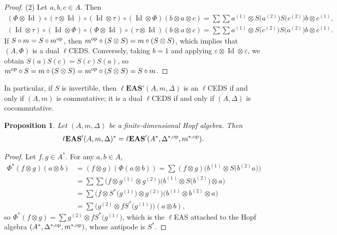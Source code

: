 \documentclass[pdftex]{sigma}
\numberwithin{equation}{section}
\newtheorem{Proposition}[Theorem]{Proposition}
 { \theoremstyle{definition}
\newtheorem{Definition}[Theorem]{Definition}
\newtheorem{Note}[Theorem]{Note}
\newtheorem{Example}[Theorem]{Example}
\newtheorem{Remark}[Theorem]{Remark}
\newtheorem{Notation}[Theorem]{Notation}}
\newcommand{\leas}{\ell\mathbf{EAS}}
\begin{document}
\begin{proof}
(2) Let $a,b,c\in A$. Then
\begin{gather*}
(\Phi\otimes \operatorname{Id})\circ (\tau \otimes \operatorname{Id})\circ (\operatorname{Id} \otimes \tau)\circ (\operatorname{Id} \otimes \Phi)(b\otimes a\otimes c)=\sum \sum a^{(1)}\otimes S\bigl(a^{(2)}\bigr)S\bigl(c^{(2)}\bigr)b\otimes c^{(1)},\\
\nonumber(\operatorname{Id} \otimes \tau)\circ (\operatorname{Id} \otimes \Phi)\circ (\Phi\otimes \operatorname{Id})\circ (\tau \otimes \operatorname{Id})(b\otimes a\otimes c)=\sum \sum a^{(1)}\otimes S\bigl(c^{(2)}\bigr)S\bigl(a^{(2)}\bigr)b\otimes c^{(1)}.
\end{gather*}
If $S\circ m=S\circ m^{\rm op}$, then $m^{\rm op}\circ (S\otimes S)=m\circ (S\otimes S)$, which implies that $(A,\Phi)$ is a dual $\ell$CEDS. Conversely, taking $b=1$ and applying $\varepsilon \otimes \operatorname{Id} \otimes \varepsilon$, we obtain
$S(a)S(c)=S(c)S(a)$,
so~${m^{\rm op}\circ S=m\circ (S\otimes S)=m^{\rm op}\circ (S\otimes S)=S\circ m}$. \end{proof}

\begin{Remark}
In particular, if $S$ is invertible, then $\leas'(A,m,\Delta)$ is an $\ell$CEDS if and only if $(A,m)$ is commutative; it is a dual $\ell$CEDS if and only if $(A,\Delta)$ is cocommutative.
\end{Remark}

\begin{Proposition}
Let $(A,m,\Delta)$ be a finite-dimensional Hopf algebra. Then \[
\leas'(A,m,\Delta)^* =\leas'(A^*,\Delta^{*,{\rm op}},m^{*,{\rm op}}).\]
\end{Proposition}

\begin{proof}
Let $f,g\in A^*$. For any $a,b\in A$,
\begin{align*}
\Phi^*(f\otimes g)(a\otimes b)&=(f\otimes g)(\Phi(a\otimes b))=\sum (f\otimes g)\bigl(b^{(1)}\otimes S\bigl(b^{(2)}a\bigr)\bigr)\\
&=\sum \sum \bigl(f\otimes g^{(1)}\otimes g^{(2)}\bigr)\bigl(b^{(1)}\otimes S\bigl(b^{(2)}\bigr)\otimes a\bigr)\\
&=\sum \bigl(f\otimes S^*\bigl(g^{(1)}\bigr)\otimes g^{(2)}\bigr)\bigl(b^{(1)}\otimes b^{(2)}\otimes a\bigr)\\
&=\sum \bigl(g^{(2)}\otimes fS^*\bigl(g^{(1)}\bigr)\bigr)(a\otimes b),
\end{align*}
so $\Phi^*(f\otimes g)=\sum g^{(2)}\otimes fS^*\bigl(g^{(1)}\bigr)$, which is the $\ell$EAS attached to the Hopf algebra $(A^*,\Delta^{*,{\rm op}},\allowbreak m^{*,{\rm op}})$, whose antipode is $S^*$. \end{proof}
\end{document}
